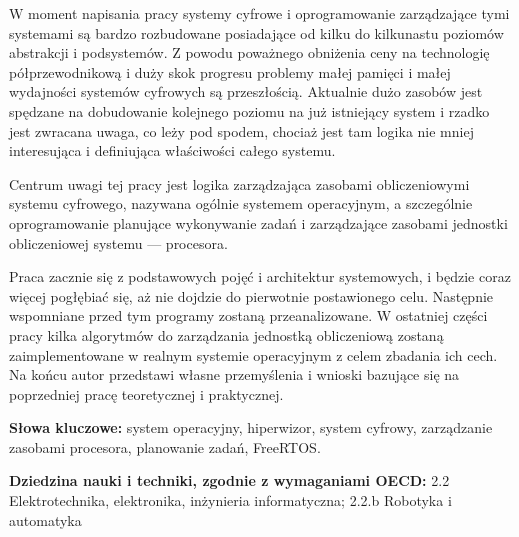 \documentclass[../main]{subfiles}
\begin{document}
W moment napisania pracy systemy cyfrowe i oprogramowanie zarządzające tymi %
systemami są bardzo rozbudowane posiadające od kilku do kilkunastu poziomów abstrakcji i podsystemów. Z
powodu poważnego obniżenia ceny na technologię półprzewodnikową i duży skok progresu problemy małej
pamięci i małej wydajności systemów cyfrowych są przeszłością. Aktualnie dużo zasobów jest spędzane na dobudowanie kolejnego poziomu na już istniejący system i rzadko jest zwracana uwaga, co leży pod spodem, chociaż jest tam logika nie mniej interesująca i definiująca właściwości całego systemu.

Centrum uwagi tej pracy jest logika zarządzająca zasobami obliczeniowymi systemu cyfrowego, nazywana ogólnie systemem operacyjnym, a szczególnie oprogramowanie planujące wykonywanie zadań i zarządzające zasobami jednostki obliczeniowej systemu — procesora.

Praca zacznie się z podstawowych pojęć i architektur systemowych, i będzie coraz więcej pogłębiać się, aż nie dojdzie do pierwotnie postawionego celu. Następnie wspomniane przed tym programy zostaną przeanalizowane. W ostatniej części pracy kilka algorytmów do zarządzania jednostką obliczeniową zostaną zaimplementowane w realnym systemie operacyjnym z celem zbadania ich cech. Na końcu autor przedstawi własne przemyślenia i wnioski bazujące się na poprzedniej pracę teoretycznej i praktycznej.

\noindent\textbf{Słowa kluczowe:} system operacyjny, hiperwizor, system cyfrowy, zarządzanie zasobami procesora, planowanie zadań, FreeRTOS.

\noindent\textbf{Dziedzina nauki i techniki, zgodnie z wymaganiami OECD:} 2.2 Elektrotechnika, elektronika, inżynieria informatyczna; 2.2.b Robotyka i automatyka
\end{document}
